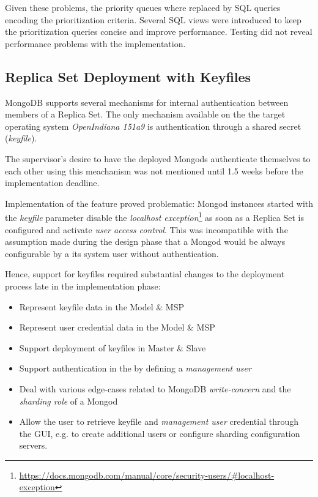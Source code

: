 Given these problems, the priority queues where replaced by SQL queries encoding the prioritization criteria.
Several SQL views were introduced to keep the prioritization queries concise and improve performance.
Testing did not reveal performance problems with the  implementation.

\subsection{Replica Set Deployment with Keyfiles}\label{:di:keyfiles}

MongoDB supports several mechanisms for internal authentication between members of a Replica Set. The only mechanism available on the
the target operating system \textit{OpenIndiana 151a9} is authentication through a shared secret (\textit{keyfile}).

The supervisor's desire to have the deployed Mongods authenticate themselves to each other using this meachanism was not mentioned 
until 1.5 weeks before the implementation deadline. %

Implementation of the feature proved problematic: Mongod instances started with the \textit{keyfile} parameter disable the 
\textit{localhost exception}\footnote{\url{https://docs.mongodb.com/manual/core/security-users/\#localhost-exception}}
as soon as a Replica Set is configured and activate \textit{user access control}. %
This was incompatible with the assumption made during the design phase that a Mongod would be always configurable by a its system user without authentication.

Hence, support for keyfiles required substantial changes to the deployment process late in the implementation phase:

\begin{itemize}
  \item Represent keyfile data in the Model \& MSP
  \item Represent user credential data in the Model \& MSP
  \item Support deployment of keyfiles in Master \& Slave
  \item Support authentication in the  by defining a \textit{management user}
  \item Deal with various edge-cases related to MongoDB \textit{write-concern} and the \textit{sharding role} of a Mongod
  \item Allow the user to retrieve keyfile and \textit{management user} credential through the GUI,
        e.g. to create additional users or configure sharding configuration servers.
\end{itemize}

